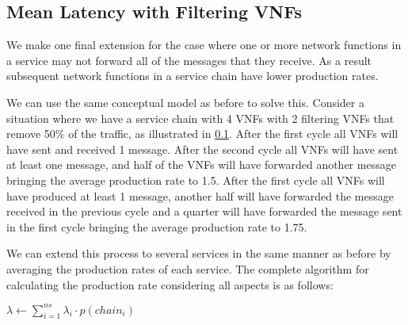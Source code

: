 \subsection{Mean Latency with Filtering VNFs}
We make one final extension for the case where one or more network functions in a service may not forward all of the messages that they receive. As a result subsequent network functions in a service chain have lower production rates. 

We can use the same conceptual model as before to solve this. Consider a situation where we have a service chain with 4 VNFs with 2 filtering VNFs that remove 50\% of the traffic, as illustrated in \ref{}. After the first cycle all VNFs will have sent and received 1 message. After the second cycle all VNFs will have sent at least one message, and half of the VNFs will have forwarded another message bringing the average production rate to 1.5. After the first cycle all VNFs will have produced at least 1 message, another half will have forwarded the message received in the previous cycle and a quarter will have forwarded the message sent in the first cycle bringing the average production rate to 1.75.

We can extend this process to several services in the same manner as before by averaging the production rates of each service. The complete algorithm for calculating the production rate considering all aspects is as follows:

\begin{algorithmic}[1]

\ENDFOR

\STATE $\lambda \leftarrow \sum_{i=1}^{ns} \lambda_i \cdot p(chain_i)$

\end{algorithmic}